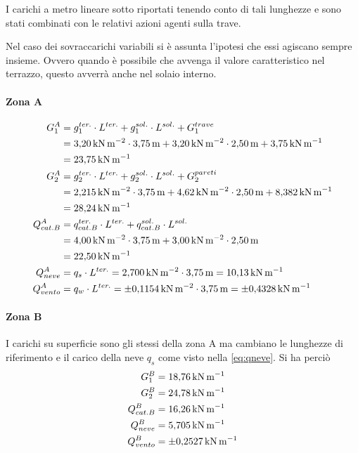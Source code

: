 I carichi a metro lineare sotto riportati tenendo conto di tali lunghezze e sono stati combinati con le relativi azioni agenti sulla trave.

Nel caso dei sovraccarichi variabili si è assunta l'ipotesi che essi agiscano sempre insieme. 
Ovvero quando è possibile che avvenga il valore caratteristico nel terrazzo, questo avverrà anche nel solaio interno.
\paragraph*{Zona A} 
\[
\begin{split}
G_1^A &=  g_1^{ter.}\cdot L^{ter.} + g_1^{sol.}\cdot L^{sol.} + G_1^{trave} \\
&= \SI{3.20}{\kilo\newton\per\square\meter}\cdot\SI{3.75}{\meter} + \SI{3.20}{\kilo\newton\per\square\meter}\cdot\SI{2.50}{\meter} + \SI{3.75}{\kilo\newton\per\meter} \\
&= \SI{23.75}{\kilo\newton\per\meter} \\
G_2^A &= g_2^{ter.}\cdot L^{ter.} + g_2^{sol.}\cdot L^{sol.} + G_2^{pareti} \\
&= \SI{2.215}{\kilo\newton\per\square\meter}\cdot\SI{3.75}{\meter} + \SI{4.62}{\kilo\newton\per\square\meter}\cdot\SI{2.50}{\meter} + \SI{8.382}{\kilo\newton\per\meter} \\
&= \SI{28.24}{\kilo\newton\per\meter}\\
Q_{cat. B}^A &= q_{cat. B}^{ter.}\cdot L^{ter.} + q_{cat. B}^{sol.}\cdot L^{sol.} \\
&= \SI{4.00}{\kilo\newton\per\square\meter}\cdot\SI{3.75}{\meter} + \SI{3.00}{\kilo\newton\per\square\meter}\cdot\SI{2.50}{\meter} \\
&= \SI{22.50}{\kilo\newton\per\meter}\\
Q_{neve}^A &= q_s \cdot L^{ter.} = \SI{2.700}{\kilo\newton\per\square\meter}\cdot\SI{3.75}{\meter} = \SI{10.13}{\kilo\newton\per\meter}\\
Q_{vento}^A &= q_w \cdot L^{ter.} = \SI{\pm 0.1154}{\kilo\newton\per\square\meter}\cdot\SI{3.75}{\meter} = \SI{\pm 0.4328}{\kilo\newton\per\meter}
\end{split}
\]
\paragraph*{Zona B} I carichi su superficie sono gli stessi della zona A ma cambiano le lunghezze di riferimento e il carico della neve $q_s$ come visto nella \eqref{eq:qneve}. 
Si ha perciò
\begin{align*}
G_1^B &= \SI{18.76}{\kilo\newton\per\meter}\\
G_2^B &= \SI{24.78}{\kilo\newton\per\meter}\\
Q_{cat. B}^B &=  \SI{16.26}{\kilo\newton\per\meter}\\
Q_{neve}^B &= \SI{5.705}{\kilo\newton\per\meter}\\
Q_{vento}^B &= \SI{\pm 0.2527}{\kilo\newton\per\meter}
\end{align*}

